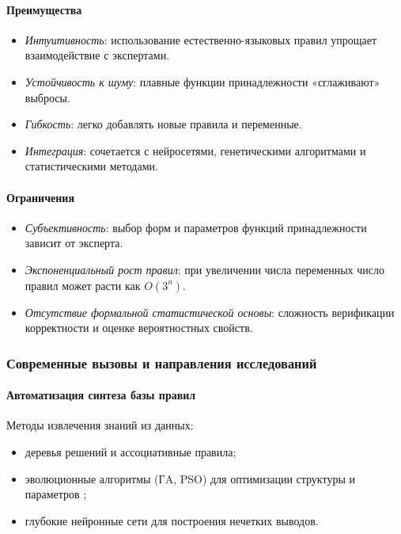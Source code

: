 \paragraph{Преимущества}
\begin{itemize}
  \item \textit{Интуитивность}: использование естественно-языковых правил упрощает взаимодействие с экспертами.
  \item \textit{Устойчивость к шуму}: плавные функции принадлежности «сглаживают» выбросы.
  \item \textit{Гибкость}: легко добавлять новые правила и переменные.
  \item \textit{Интеграция}: сочетается с нейросетями, генетическими алгоритмами и статистическими методами.
\end{itemize}

\paragraph{Ограничения}
\begin{itemize}
  \item \textit{Субъективность}: выбор форм и параметров функций принадлежности зависит от эксперта.
  \item \textit{Экспоненциальный рост правил}: при увеличении числа переменных число правил может расти как \(O(3^n)\).
  \item \textit{Отсутствие формальной статистической основы}: сложность верификации корректности и оценке вероятностных свойств.
\end{itemize}


\subsubsection{Современные вызовы и направления исследований}
\label{subsec:challenges}

\paragraph{Автоматизация синтеза базы правил}


Методы извлечения знаний из данных:
\begin{itemize}
  \item деревья решений и ассоциативные правила;
  \item эволюционные алгоритмы (ГA, PSO) для оптимизации структуры и параметров \cite{Pedrycz1993};
  \item глубокие нейронные сети для построения нечетких выводов.
\end{itemize}

